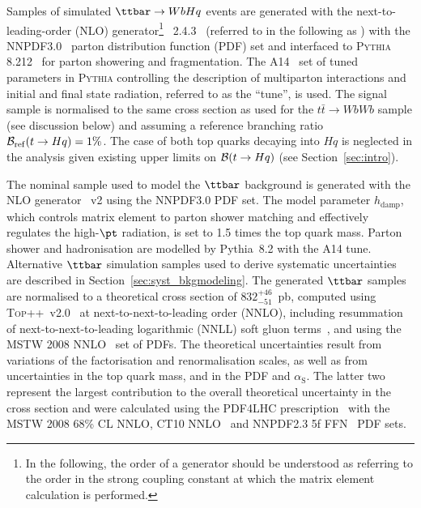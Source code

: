 Samples of simulated $\ttbar \to WbHq$ events are generated with the next-to-leading-order (NLO) generator\footnote{In the following, 
the order of a generator should be understood as referring to the order in the strong coupling constant at which the matrix element calculation 
is performed.} {\amcatnlolong}~2.4.3~\cite{Alwall:2014hca}  (referred to in the following as {\amcatnlo}) with the NNPDF3.0~\cite{Ball:2014uwa} parton distribution function (PDF) set and interfaced to \textsc{Pythia} 8.212~\cite{Sjostrand:2007gs} for parton showering and fragmentation. 
The A14~\cite{ATLASUETune4} set of tuned parameters in \textsc{Pythia} controlling the description of multiparton interactions and  
initial and final state radiation, referred to as the ``tune'', is used.
The signal sample is normalised to the same cross section as used for the $t\bar{t}\to WbWb$ sample (see discussion below) and
assuming a reference branching ratio $\mathcal{B}_{\mathrm{ref}}(t\to Hq)=1\%$.
The case of both top quarks decaying into $Hq$ is neglected in the analysis given existing upper limits on $\mathcal{B}(t \to Hq)$ (see Section~\ref{sec:intro}).

The nominal sample used to model the $\ttbar$ background is generated with the NLO generator {\powheg}~v2 \cite{Frixione:2007nw,Nason:2004rx,Frixione:2007vw,Alioli:2010xd} using the NNPDF3.0 PDF set. The {\powheg} model parameter $h_{\textrm{damp}}$, which controls 
matrix element to parton shower matching and effectively regulates the high-$\pt$ radiation, is set to 1.5 times the top quark mass. 
Parton shower and hadronisation are modelled by {\textsc Pythia}~8.2 with the A14 tune.
Alternative $\ttbar$ simulation samples used to derive systematic uncertainties are described in Section~\ref{sec:syst_bkgmodeling}. 
The generated $\ttbar$ samples are normalised to a theoretical cross section of $832^{+46}_{-51}$~pb, 
computed using \textsc{Top++}~v2.0~\cite{Czakon:2011xx} at next-to-next-to-leading order (NNLO), 
including resummation of next-to-next-to-leading logarithmic (NNLL) soft gluon 
terms~\cite{Cacciari:2011hy,Baernreuther:2012ws,Czakon:2012zr,Czakon:2012pz,Czakon:2013goa}, 
and using the MSTW 2008 NNLO~\cite{Martin:2009iq,Martin:2009bu} set of PDFs. 
The theoretical uncertainties result from variations of the factorisation and renormalisation scales, as well as from uncertainties in the
top quark mass, and in the PDF and $\alpha_{\textrm{S}}$. The latter two represent the largest contribution to the overall theoretical uncertainty 
in the cross section and were calculated using the PDF4LHC prescription~\cite{Botje:2011sn} 
with the MSTW 2008 68\% CL NNLO, CT10 NNLO~\cite{Lai:2010vv,Gao:2013xoa} and NNPDF2.3 5f FFN~\cite{Ball:2012cx} PDF sets.

